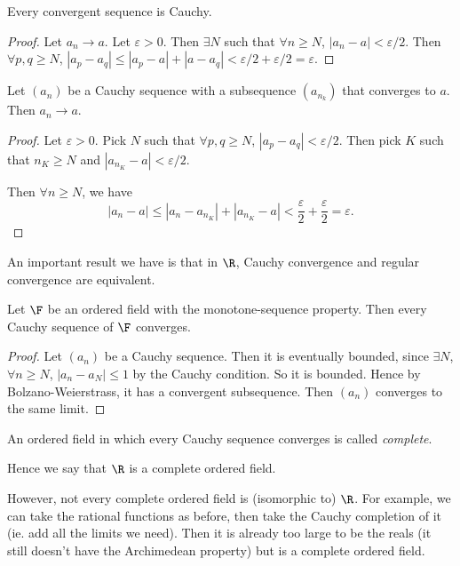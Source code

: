 \documentclass[a4paper]{article}
\begin{document}
\begin{lemma}
  Every convergent sequence is Cauchy.
\end{lemma}

\begin{proof}
  Let $a_n \to a$. Let $\varepsilon > 0$. Then $\exists N$ such that $\forall n \geq N$, $|a_n - a| < \varepsilon/2$. Then $\forall p, q\geq N$, $|a_p - a_q| \leq |a_p - a| + |a - a_q| < \varepsilon/2 + \varepsilon/2 = \varepsilon$.
\end{proof}

\begin{lemma}
  Let $(a_n)$ be a Cauchy sequence with a subsequence $(a_{n_k})$ that converges to $a$. Then $a_n\to a$.
\end{lemma}

\begin{proof}
  Let $\varepsilon > 0$. Pick $N$ such that $\forall p, q\geq N$, $|a_p - a_q| < \varepsilon/2$. Then pick $K$ such that $n_K \geq N$ and $|a_{n_K} - a| < \varepsilon/2$.

  Then $\forall n \geq N$, we have
  \[
    |a_n - a| \leq |a_n - a_{n_K}| + |a_{n_K} - a| < \frac{\varepsilon}{2} + \frac{\varepsilon}{2} = \varepsilon.
  \]
\end{proof}

An important result we have is that in $\R$, Cauchy convergence and regular convergence are equivalent.
\begin{thm}
  Let $\F$ be an ordered field with the monotone-sequence property. Then every Cauchy sequence of $\F$ converges.
\end{thm}

\begin{proof}
Let $(a_n)$ be a Cauchy sequence. Then it is eventually bounded, since $\exists N$, $\forall n \geq N$, $|a_n - a_N| \leq 1$ by the Cauchy condition. So it is bounded. Hence by Bolzano-Weierstrass, it has a convergent subsequence. Then $(a_n)$ converges to the same limit.
\end{proof}

\begin{defi}
  An ordered field in which every Cauchy sequence converges is called \emph{complete}.
\end{defi}

Hence we say that $\R$ is a complete ordered field.

However, not every complete ordered field is (isomorphic to) $\R$. For example, we can take the rational functions as before, then take the Cauchy completion of it (ie. add all the limits we need). Then it is already too large to be the reals (it still doesn't have the Archimedean property) but is a complete ordered field.
\end{document}
